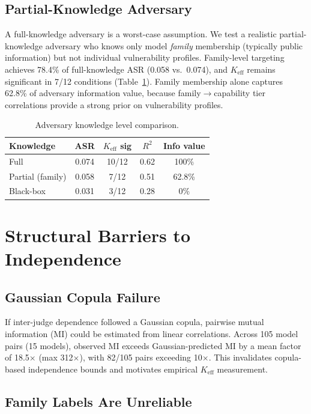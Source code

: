 \documentclass[11pt,a4paper]{article}
\newcommand{\keff}{K_{\text{eff}}}
\begin{document}
\subsection{Partial-Knowledge Adversary}

A full-knowledge adversary is a worst-case assumption. We test a realistic partial-knowledge adversary who knows only model \emph{family} membership (typically public information) but not individual vulnerability profiles. Family-level targeting achieves 78.4\% of full-knowledge ASR (0.058 vs.\ 0.074), and $\keff$ remains significant in 7/12 conditions (Table~\ref{tab:partial}). Family membership alone captures 62.8\% of adversary information value, because family$\to$capability tier correlations provide a strong prior on vulnerability profiles.

\begin{table}[t]
\centering
\small
\caption{Adversary knowledge level comparison.}
\label{tab:partial}
\begin{tabular}{lcccc}
\toprule
Knowledge & ASR & $\keff$ sig & $R^2$ & Info value \\
\midrule
Full & 0.074 & 10/12 & 0.62 & 100\% \\
Partial (family) & 0.058 & 7/12 & 0.51 & 62.8\% \\
Black-box & 0.031 & 3/12 & 0.28 & 0\% \\
\bottomrule
\end{tabular}
\end{table}

\section{Structural Barriers to Independence}

\subsection{Gaussian Copula Failure}

If inter-judge dependence followed a Gaussian copula, pairwise mutual information (MI) could be estimated from linear correlations. Across 105 model pairs (15 models), observed MI exceeds Gaussian-predicted MI by a mean factor of 18.5$\times$ (max 312$\times$), with 82/105 pairs exceeding 10$\times$. This invalidates copula-based independence bounds and motivates empirical $\keff$ measurement.

\subsection{Family Labels Are Unreliable}
\end{document}
